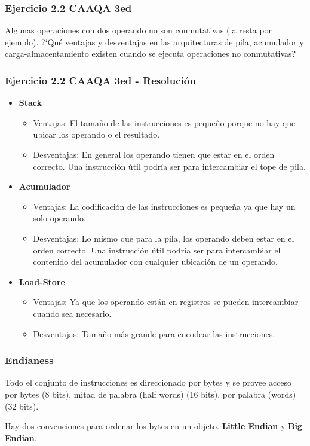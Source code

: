 \documentclass{beamer}
\begin{document}
\begin{frame}
 \frametitle{Ejercicio 2.2 CAAQA 3ed}
Algunas operaciones con dos operando no son conmutativas (la resta por ejemplo). ?`Qué ventajas y desventajas en las arquitecturas de pila, acumulador y carga-almacentamiento existen cuando se ejecuta operaciones no conmutativas?
\end{frame}

\begin{frame}
 \frametitle{Ejercicio 2.2 CAAQA 3ed - Resolución}
\begin{itemize}
 \item \textbf{Stack}
  \begin{itemize}
    \item Ventajas: El tamaño de las instrucciones es pequeño porque no hay que ubicar los operando o el resultado.
    \item Desventajas: En general los operando tienen que estar en el orden correcto. Una instrucción útil podría ser para intercambiar el tope de pila.
  \end{itemize}

\item \textbf{Acumulador}
\begin{itemize}
\item Ventajas: La codificación de las instrucciones es pequeña ya que hay un solo operando.
\item Desventajas: Lo mismo que para la pila, los operando deben estar en el orden correcto. Una instrucción útil podría ser para intercambiar el contenido del acumulador con cualquier ubicación de un operando.
\end{itemize}

\item \textbf{Load-Store}
\begin{itemize}
\item Ventajas: Ya que los operando están en registros se pueden intercambiar cuando sea necesario.
\item Desventajas: Tamaño más grande para encodear las instrucciones.
\end{itemize}
\end{itemize}

\end{frame}


\begin{frame}
 \frametitle{Endianess}
Todo el conjunto de instrucciones es direccionado por bytes y se provee acceso por bytes (8 bits), mitad de palabra (half words) (16 bits), por palabra (words) (32 bits).

\bigskip

Hay dos convenciones para ordenar los bytes en un objeto. \textbf{Little Endian} y \textbf{Big Endian}.
 \end{frame}
 
\end{document}
